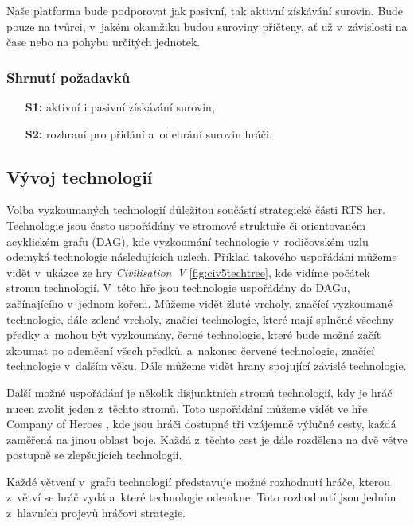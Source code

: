 Naše platforma bude podporovat jak pasivní, tak aktivní získávání surovin. Bude pouze na tvůrci, v~jakém okamžiku budou suroviny přičteny, ať už v~závislosti na čase nebo na pohybu určitých jednotek. 

\subsubsection{Shrnutí požadavků}

\begin{itemize}
	\item[\textbf{S1:}] aktivní i pasivní získávání surovin,
	\item[\textbf{S2:}] rozhraní pro přidání a~odebrání surovin hráči.
\end{itemize}

\subsection{Vývoj technologií}
\label{sec:vyzkum}
Volba vyzkoumaných technologií důležitou součástí strategické části RTS her. Technologie jsou často uspořádány ve stromové struktuře či orientovaném acyklickém grafu (DAG), kde vyzkoumání technologie v~rodičovském uzlu odemyká technologie následujících uzlech. Příklad takového uspořádání můžeme vidět v~ukázce ze hry \emph{Civilisation~V} \citep{site:civ5}\ref{fig:civ5techtree}, kde vidíme počátek stromu technologií. V~této hře jsou technologie uspořádány do DAGu, začínajícího v~jednom kořeni. Můžeme vidět žluté vrcholy, značící vyzkoumané technologie, dále zelené vrcholy, značící technologie, které mají splněné všechny předky a~mohou být vyzkoumány, černé technologie, které bude možné začít zkoumat po odemčení všech předků, a~nakonec červené technologie, značící technologie v~dalším věku. Dále můžeme vidět hrany spojující závislé technologie. 

Další možné uspořádání je několik disjunktních stromů technologií, kdy je hráč nucen zvolit jeden z~těchto stromů. 
Toto uspořádání můžeme vidět ve hře Company of Heroes \citep{site:COH}, kde jsou hráči dostupné tři vzájemně výlučné cesty, každá zaměřená na jinou oblast boje. Každá z~těchto cest je dále rozdělena na dvě větve postupně se zlepšujících technologií.

Každé větvení v~grafu technologií představuje možné rozhodnutí hráče, kterou z~větví se hráč vydá a~které technologie odemkne. Toto rozhodnutí jsou jedním z~hlavních projevů hráčovi strategie.

